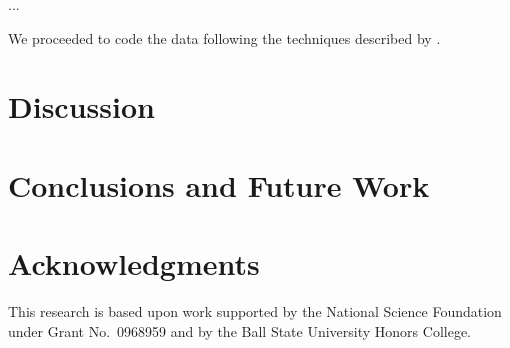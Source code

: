 \documentclass[letterpaper]{article}
\begin{document}
...

We proceeded to code the data following the techniques described
by \citet{Saldana2009}.


\section{Discussion}

\section{Conclusions and Future Work}

\section{Acknowledgments}

This research is based upon work supported by the National Science
Foundation under Grant No.~0968959 and by the Ball State University
Honors College.




\end{document}
